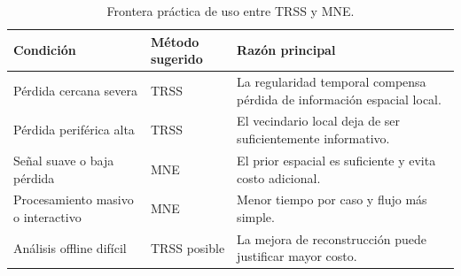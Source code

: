 \begin{table}[H]
\centering
\small
\caption{Frontera práctica de uso entre TRSS y MNE.}
\label{tab:ch4_decision_boundary_trss_mne}
\begin{tabular}{@{}p{4.0cm}p{3.0cm}p{4.5cm}@{}}
\toprule
Condición & Método sugerido & Razón principal \\
\midrule
Pérdida cercana severa & TRSS & La regularidad temporal compensa pérdida de información espacial local. \\
Pérdida periférica alta & TRSS & El vecindario local deja de ser suficientemente informativo. \\
Señal suave o baja pérdida & MNE & El prior espacial es suficiente y evita costo adicional. \\
Procesamiento masivo o interactivo & MNE & Menor tiempo por caso y flujo más simple. \\
Análisis offline difícil & TRSS posible & La mejora de reconstrucción puede justificar mayor costo. \\
\bottomrule
\end{tabular}
\end{table}
